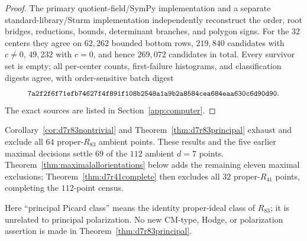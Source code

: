 \begin{proof}
The primary quotient-field/SymPy implementation and a separate
standard-library/Sturm implementation independently reconstruct the order,
root bridges, reductions, bounds, determinant branches, and polygon signs.
For the $32$ centers they agree on $62{,}262$ bounded bottom rows,
$219{,}840$ candidates with $c\ne0$, $49{,}232$ with $c=0$, and hence
$269{,}072$ candidates in total. Every survivor set is empty; all per-center
counts, first-failure histograms, and classification digests agree, with
order-sensitive batch digest
\[
 \digest{7a2f2f6f71efb74627f4f891f108b25}{48a1a9b2a8584cea684eaa630c6d90d90}.
\]
The exact sources are listed in Section~\ref{app:computer}.
\end{proof}

\begin{corollary}
\label{cor:d7r83all}
Corollary~\ref{cor:d7r83nontrivial} and
Theorem~\ref{thm:d7r83principal} exhaust and exclude all $64$ proper-$R_{83}$
ambient points. These results and the five earlier maximal decisions
settle $69$ of the $112$ ambient $d=7$ points. Theorem~\ref{thm:maximalallorientations}
below adds the remaining eleven maximal exclusions;
Theorem~\ref{thm:d7r41complete} then excludes all $32$ proper-$R_{41}$
points, completing the $112$-point census.
\end{corollary}

Here ``principal Picard class'' means the identity proper-ideal class of
$R_{83}$; it is unrelated to principal polarization. No new CM-type, Hodge,
or polarization assertion is made in Theorem~\ref{thm:d7r83principal}.



